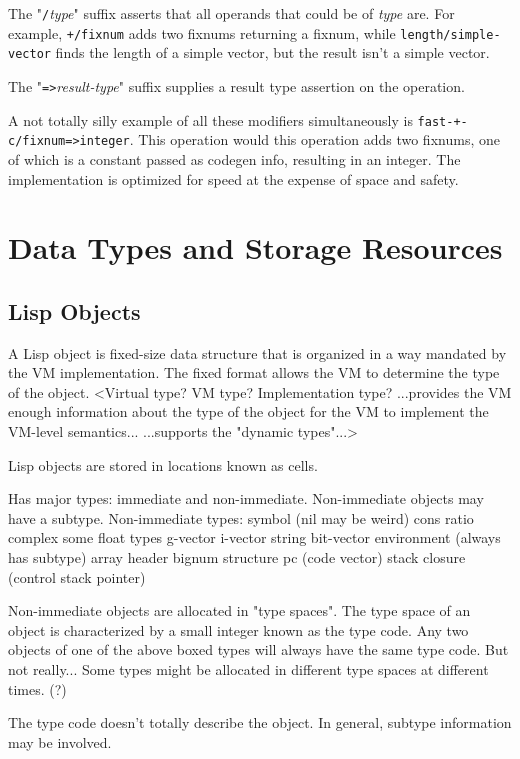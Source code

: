 The "{\tt /}{\it type}" suffix asserts that all operands that could be of {\it type} are.
For example, {\tt +/fixnum} adds two fixnums returning a fixnum, while
{\tt length/simple-vector} finds the length of a simple vector, but the result isn't
a simple vector.

The "{\tt =>}{\it result-type}" suffix supplies a result type assertion on the
operation.

A not totally silly example of all these modifiers simultaneously is
 {\tt fast-+-c/fixnum=>integer}.  This operation would this operation adds two
fixnums, one of which is a constant passed as codegen info, resulting in an
integer.  The implementation is optimized for speed at the expense of space and
safety.



\chapter{Data Types and Storage Resources}


\section{Lisp Objects}

A Lisp object is fixed-size data structure that is organized in a way mandated
by the VM implementation.  The fixed format allows the VM to determine the type
of the object.  \comment<Virtual type?  VM type?  Implementation type?
...provides the VM enough information about the type of the object for the VM
to implement the VM-level semantics...  ...supports the "dynamic types"...>

Lisp objects are stored in locations known as cells. 


Has major types: immediate and non-immediate.
Non-immediate objects may have a subtype.
Non-immediate types:
  symbol (nil may be weird)
  cons 
  ratio
  complex
  some float types
  g-vector
  i-vector
  string
  bit-vector
  environment (always has subtype)
  array header
  bignum
  structure
  pc (code vector)
  stack closure (control stack pointer)

Non-immediate objects are allocated in "type spaces".  The type space of an
object is characterized by a small integer known as the type code.  Any two
objects of one of the above boxed types will always have the same type code.
{But not really...  Some types might be allocated in different type spaces at
different times. (?)}

The type code doesn't totally describe the object.  In general, subtype
information may be involved.


